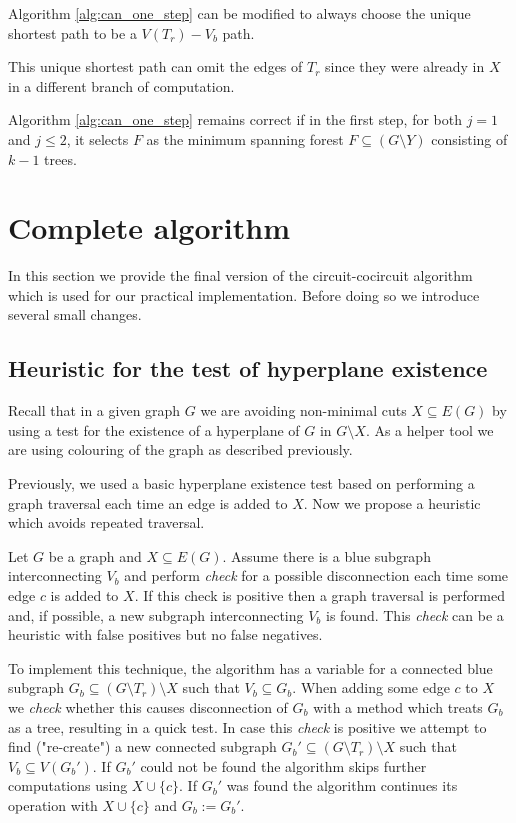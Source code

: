 \begin{cor}
	Algorithm \ref{alg:can_one_step} can be modified to always choose the unique shortest path to be a $V(T_r){-}V_b$ path.
\end{cor}

This unique shortest path can omit the edges of $T_r$ since they were already in $X$ in a different branch of computation.

\begin{claim}
	\label{forest_sel_claim}
	Algorithm \ref{alg:can_one_step} remains correct if in the first step, for both $j = 1$ and $j \leq 2$, it selects $F$ as the minimum spanning forest ${F \subseteq (G \setminus Y)}$ consisting of $k-1$ trees.
\end{claim}

\section{Complete algorithm}

In this section we provide the final version of the circuit-cocircuit algorithm which is used for our practical implementation. Before doing so we introduce several small changes.


\subsection*{Heuristic for the test of hyperplane existence}
Recall that in a given graph $G$ we are avoiding non-minimal cuts $X \subseteq E(G)$ by using a test for the existence of a hyperplane of $G$ in $G \setminus X$. As a helper tool we are using colouring of the graph as described previously.

Previously, we used a basic hyperplane existence test based on performing a graph traversal each time an edge is added to $X$. Now we propose a heuristic which avoids repeated traversal.

\begin{claim}
	Let $G$ be a graph and $X \subseteq E(G)$. Assume there is a blue subgraph interconnecting $V_b$ and perform \textit{check} for a possible disconnection each time some edge $c$ is added to $X$. If this check is positive then a graph traversal is performed and, if possible, a new subgraph interconnecting $V_b$ is found. This \textit{check} can be a heuristic with false positives but no false negatives.
\end{claim}

To implement this technique, the algorithm has a variable for a connected blue subgraph $G_b \subseteq (G \setminus T_r) \setminus X$ such that $V_b \subseteq G_b$. When adding some edge $c$ to $X$ we \textit{check} whether this causes disconnection of $G_b$ with a method which treats $G_b$ as a tree, resulting in a quick test. In case this \textit{check} is positive we attempt to find ("re-create") a new connected subgraph $G_b' \subseteq (G \setminus T_r) \setminus X$ such that $V_b \subseteq V(G_b')$. If $G_b'$ could not be found the algorithm skips further computations using $X \cup \{c\}$. If $G_b'$ was found the algorithm continues its operation with $X \cup \{c\}$ and $G_b := G_b'$.

